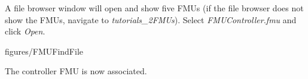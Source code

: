 \documentclass[11pt,a4paper]{../tutorial}
\begin{document}
\begin{instructions}
%
%
%
%
%

\item A file browser window will open and show five FMUs (if the file browser does not show the FMUs, navigate to \emph{tutorials\_2\pathsep{}FMUs}). Select \emph{FMUController.fmu} and click \emph{Open}.

%
%

    \begin{annotation}[width=0.8\linewidth]{figures/FMUFindFile}
    \end{annotation}

\newpage
\item The controller FMU is now associated.


\end{instructions}
\end{document}
